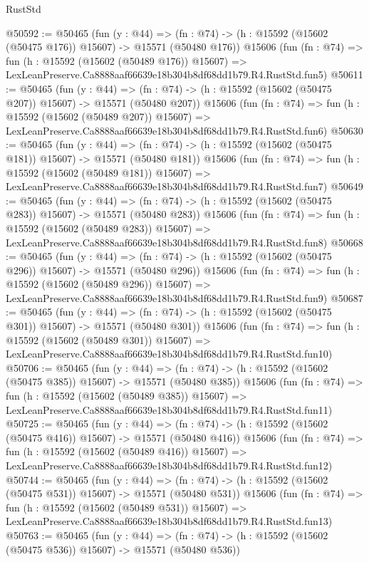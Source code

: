 \begin{lexlean}{RustStd}
\begin{coremodule}
@50592 := @50465
    (fun (y : @44) =>
    (fn : @74) -> (h : @15592 (@15602 (@50475 @176)) @15607) -> @15571 (@50480 @176))
    @15606
    (fun (fn : @74) =>
    fun (h : @15592 (@15602 (@50489 @176)) @15607) =>
    LexLeanPreserve.Ca8888aaf66639e18b304b8df68dd1b79.R4.RustStd.fun5)
@50611 := @50465
    (fun (y : @44) =>
    (fn : @74) -> (h : @15592 (@15602 (@50475 @207)) @15607) -> @15571 (@50480 @207))
    @15606
    (fun (fn : @74) =>
    fun (h : @15592 (@15602 (@50489 @207)) @15607) =>
    LexLeanPreserve.Ca8888aaf66639e18b304b8df68dd1b79.R4.RustStd.fun6)
@50630 := @50465
    (fun (y : @44) =>
    (fn : @74) -> (h : @15592 (@15602 (@50475 @181)) @15607) -> @15571 (@50480 @181))
    @15606
    (fun (fn : @74) =>
    fun (h : @15592 (@15602 (@50489 @181)) @15607) =>
    LexLeanPreserve.Ca8888aaf66639e18b304b8df68dd1b79.R4.RustStd.fun7)
@50649 := @50465
    (fun (y : @44) =>
    (fn : @74) -> (h : @15592 (@15602 (@50475 @283)) @15607) -> @15571 (@50480 @283))
    @15606
    (fun (fn : @74) =>
    fun (h : @15592 (@15602 (@50489 @283)) @15607) =>
    LexLeanPreserve.Ca8888aaf66639e18b304b8df68dd1b79.R4.RustStd.fun8)
@50668 := @50465
    (fun (y : @44) =>
    (fn : @74) -> (h : @15592 (@15602 (@50475 @296)) @15607) -> @15571 (@50480 @296))
    @15606
    (fun (fn : @74) =>
    fun (h : @15592 (@15602 (@50489 @296)) @15607) =>
    LexLeanPreserve.Ca8888aaf66639e18b304b8df68dd1b79.R4.RustStd.fun9)
@50687 := @50465
    (fun (y : @44) =>
    (fn : @74) -> (h : @15592 (@15602 (@50475 @301)) @15607) -> @15571 (@50480 @301))
    @15606
    (fun (fn : @74) =>
    fun (h : @15592 (@15602 (@50489 @301)) @15607) =>
    LexLeanPreserve.Ca8888aaf66639e18b304b8df68dd1b79.R4.RustStd.fun10)
@50706 := @50465
    (fun (y : @44) =>
    (fn : @74) -> (h : @15592 (@15602 (@50475 @385)) @15607) -> @15571 (@50480 @385))
    @15606
    (fun (fn : @74) =>
    fun (h : @15592 (@15602 (@50489 @385)) @15607) =>
    LexLeanPreserve.Ca8888aaf66639e18b304b8df68dd1b79.R4.RustStd.fun11)
@50725 := @50465
    (fun (y : @44) =>
    (fn : @74) -> (h : @15592 (@15602 (@50475 @416)) @15607) -> @15571 (@50480 @416))
    @15606
    (fun (fn : @74) =>
    fun (h : @15592 (@15602 (@50489 @416)) @15607) =>
    LexLeanPreserve.Ca8888aaf66639e18b304b8df68dd1b79.R4.RustStd.fun12)
@50744 := @50465
    (fun (y : @44) =>
    (fn : @74) -> (h : @15592 (@15602 (@50475 @531)) @15607) -> @15571 (@50480 @531))
    @15606
    (fun (fn : @74) =>
    fun (h : @15592 (@15602 (@50489 @531)) @15607) =>
    LexLeanPreserve.Ca8888aaf66639e18b304b8df68dd1b79.R4.RustStd.fun13)
@50763 := @50465
    (fun (y : @44) =>
    (fn : @74) -> (h : @15592 (@15602 (@50475 @536)) @15607) -> @15571 (@50480 @536))

\end{coremodule}
\end{lexlean}
